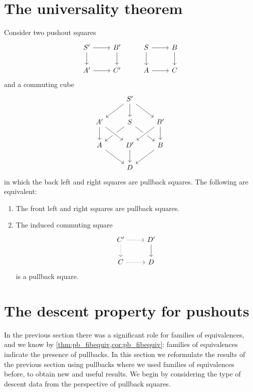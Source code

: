 \section{The universality theorem}
\begin{thm}
  Consider two pushout squares
  \begin{equation*}
    \begin{tikzcd}
      S' \arrow[r] \arrow[d] & B' \arrow[d] & S \arrow[r] \arrow[d] & B \arrow[d] \\
      A' \arrow[r] & C' & A \arrow[r] & C
    \end{tikzcd}
  \end{equation*}
  and a commuting cube
  \begin{equation*}
    \begin{tikzcd}
      & S' \arrow[dl] \arrow[d] \arrow[dr] \\
      A' \arrow[d] & S \arrow[dl] \arrow[dr] & B' \arrow[d] \arrow[dl,crossing over] \\
      A \arrow[dr] & D' \arrow[from=ul,crossing over] \arrow[d] & B \arrow[dl] \\
      & D
    \end{tikzcd}
  \end{equation*}
  in which the back left and right squares are pullback squares. The following are equivalent:
  \begin{enumerate}
  \item The front left and right squares are pullback squares.
  \item The induced commuting square
    \begin{equation*}
      \begin{tikzcd}
        C' \arrow[r,densely dotted] \arrow[d,densely dotted] & D' \arrow[d] \\
        C \arrow[r,densely dotted] & D
      \end{tikzcd}
    \end{equation*}
    is a pullback square.
  \end{enumerate}
\end{thm}


\section{The descent property for pushouts}

In the previous section there was a significant role for families of equivalences, and we know by \cref{thm:pb_fibequiv,cor:pb_fibequiv}: families of equivalences indicate the presence of pullbacks. In this section we reformulate the results of the previous section using pullbacks where we used families of equivalences before, to obtain new and useful results. We begin by considering the type of descent data from the perspective of pullback squares.

